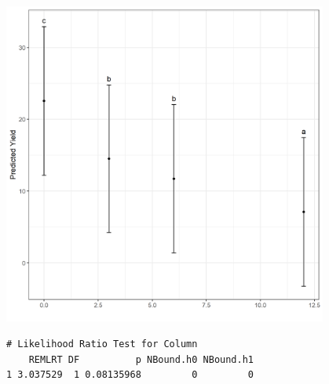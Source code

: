 \documentclass[a4paper, 10pt, fleqn, twosided]{memoir}
\begin{document}
\begin{tcolorbox}[title = Exercise 17 output continued]
\includegraphics[width=0.8\textwidth, frame]{Exercise17RatePred.png}
\end{tcolorbox}

\begin{tcolorbox}[title = Exercise 17 output continued]
\begin{verbatim}
# Likelihood Ratio Test for Column
    REMLRT DF          p NBound.h0 NBound.h1
1 3.037529  1 0.08135968         0         0
\end{verbatim}
\end{tcolorbox}
\clearpage



\end{document}
